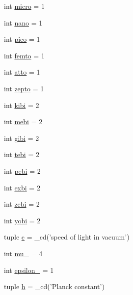 \begin{DoxyCompactItemize}
int \hyperlink{namespacescipy_1_1constants_1_1constants_aeeba333af58793ac5f523aff091fd4ad}{micro} = 1
\item 
int \hyperlink{namespacescipy_1_1constants_1_1constants_af1df3f24f14f1f73fc7b1b95dd2546bb}{nano} = 1
\item 
int \hyperlink{namespacescipy_1_1constants_1_1constants_aff47c5b98c198e531b2b146156faf906}{pico} = 1
\item 
int \hyperlink{namespacescipy_1_1constants_1_1constants_a63f41a8c5148e36db188bb3c2a4a8c29}{femto} = 1
\item 
int \hyperlink{namespacescipy_1_1constants_1_1constants_a659c2550e4a18f4558dd387a3f0656eb}{atto} = 1
\item 
int \hyperlink{namespacescipy_1_1constants_1_1constants_afcabfa7332c210844d4561012a237364}{zepto} = 1
\item 
int \hyperlink{namespacescipy_1_1constants_1_1constants_a02369f4053c7fb00b1e1149b8feb4309}{kibi} = 2
\item 
int \hyperlink{namespacescipy_1_1constants_1_1constants_a0fbddddd9a10c60cc179240cc4b38912}{mebi} = 2
\item 
int \hyperlink{namespacescipy_1_1constants_1_1constants_a363f11cb1db721559d9129fa566d0e47}{gibi} = 2
\item 
int \hyperlink{namespacescipy_1_1constants_1_1constants_a19fe5de8490b084e76d32385e2dc13a1}{tebi} = 2
\item 
int \hyperlink{namespacescipy_1_1constants_1_1constants_a62717765467866887f45379048f5d10b}{pebi} = 2
\item 
int \hyperlink{namespacescipy_1_1constants_1_1constants_aacd055b43e98c8619ad9beb7e3bfef1c}{exbi} = 2
\item 
int \hyperlink{namespacescipy_1_1constants_1_1constants_a35f1e4984ad490bdee8104eefd9b9502}{zebi} = 2
\item 
int \hyperlink{namespacescipy_1_1constants_1_1constants_a3a0595a97ed01354fa3b965e8d3bdc1a}{yobi} = 2
\item 
tuple \hyperlink{namespacescipy_1_1constants_1_1constants_aac0929e32a49dd3a9100b7545599d2f3}{c} = \+\_\+cd('speed of light in vacuum')
\item 
int \hyperlink{namespacescipy_1_1constants_1_1constants_aa2fb9bee4dae13c51b80171ab277c27d}{mu\+\_} = 4
\item 
int \hyperlink{namespacescipy_1_1constants_1_1constants_a123c385b6f96763a3d3fdad4916e6751}{epsilon\+\_} = 1
\item 
tuple \hyperlink{namespacescipy_1_1constants_1_1constants_aad83d1b4f2eed9e65764c15b5fd647e7}{h} = \+\_\+cd('Planck constant')

\end{DoxyCompactItemize}
